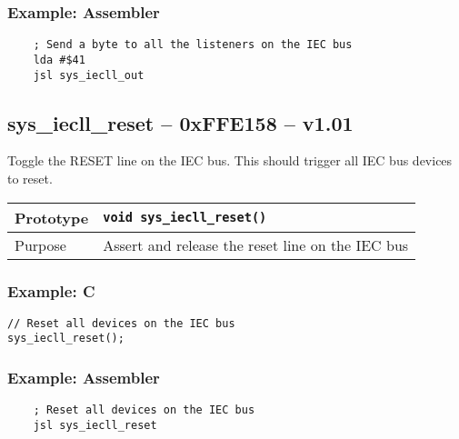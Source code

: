 \subsubsection*{Example: Assembler}
\begin{verbatim}
    ; Send a byte to all the listeners on the IEC bus
    lda #$41
    jsl sys_iecll_out
\end{verbatim}


\subsection*{sys\_iecll\_reset -- 0xFFE158 -- v1.01}
Toggle the RESET line on the IEC bus. This should trigger all IEC bus devices to reset.

\bigskip

\begin{table}[!h]\begin{tabular}{|l||l|} \hline
Prototype & \lstinline!void sys_iecll_reset()! \\ \hline
Purpose & Assert and release the reset line on the IEC bus \\ \hline
\end{tabular}\end{table}

\subsubsection*{Example: C}
\begin{lstlisting}
// Reset all devices on the IEC bus
sys_iecll_reset();
\end{lstlisting}

\subsubsection*{Example: Assembler}
\begin{verbatim}
    ; Reset all devices on the IEC bus
    jsl sys_iecll_reset
\end{verbatim}
